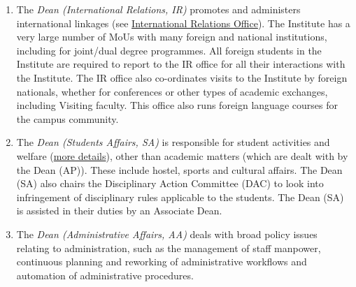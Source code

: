 \documentclass[
  10pt,
  a5paper,
  10pt,
  openany]{amsbook}
\begin{document}
\begin{enumerate}
  accommodation. As such, the Dean (IPS) leads four offices: the Estate
  Office, which is responsible for civil infrastructure maintenance, the
  Electrical Maintenance Division, which is responsible for power supply
  and electrical maintenance (including air conditioners), the Design
  Cell, which is responsible for interior design and renovation and the
  Public Health Office. Associate Dean-I (IPS) and Associate Dean-II
  (IPS) assist the Dean in discharging these responsibilities. Associate
  Dean - I (IPS) focuses on civil infrastructure maintenance, while
  Associate Dean -II (IPS) focuses on power supply and electrical
  maintenance including air-conditioners. Associate Dean - II (IPS) also
  serves as the Chairperson, Accommodation Allotment Committee (AAC);
  that is, (s)he is directly responsible for housing related matters. A
  \hyperref[sec:morehousing]{later section of this handbook} will
  provide more detail on this. The post of Associate Dean - III (IPS)
  has also been proposed and is awaiting approval as of mid-2021.
\item
  The \emph{Dean (International Relations, IR)} promotes and administers
  international linkages (see
  \href{http://www.ir.iitb.ac.in/}{International Relations Office}). The
  Institute has a very large number of MoUs with many foreign and
  national institutions, including for joint/dual degree programmes. All
  foreign students in the Institute are required to report to the IR
  office for all their interactions with the Institute. The IR office
  also co-ordinates visits to the Institute by foreign nationals,
  whether for conferences or other types of academic exchanges,
  including Visiting faculty. This office also runs foreign language
  courses for the campus community.
\item
  The \emph{Dean (Students Affairs, SA)} is responsible for student
  activities and welfare
  (\href{https://gymkhana.iitb.ac.in/students/contact.html}{more
  details}), other than academic matters (which are dealt with by the
  Dean (AP)). These include hostel, sports and cultural affairs. The
  Dean (SA) also chairs the Disciplinary Action Committee (DAC) to look
  into infringement of disciplinary rules applicable to the students.
  The Dean (SA) is assisted in their duties by an Associate Dean.
\item
  The \emph{Dean (Administrative Affairs, AA)} deals with broad policy
  issues relating to administration, such as the management of staff
  manpower, continuous planning and reworking of administrative
  workflows and automation of administrative procedures.

\end{enumerate}
\end{document}
